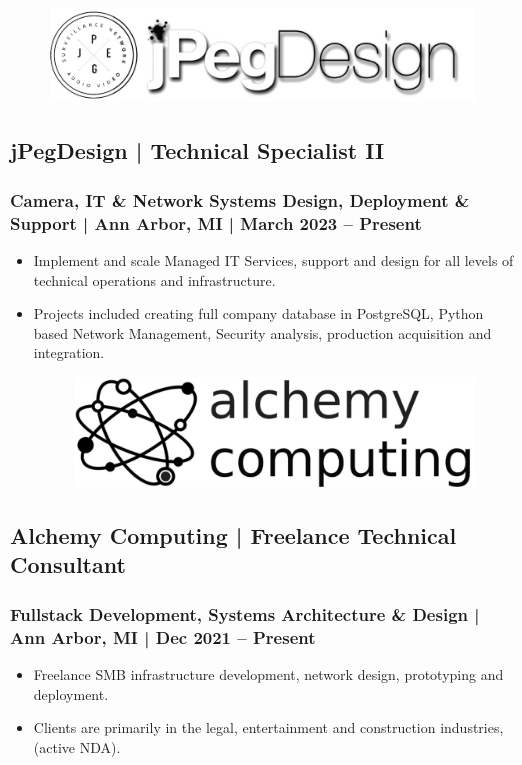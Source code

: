 \documentclass[letter,10pt]{article}
\begin{document}
\begin{figure}
\includegraphics[width=0.8\linewidth]{./img/jpeg_banner.jpg}
\end{figure}

\subsection*{jPegDesign | Technical Specialist II}
\label{sec:org7b523a7}
\subsubsection*{Camera, IT \& Network Systems Design, Deployment \& Support | Ann Arbor, MI | March 2023 – Present}
\label{sec:org040c54e}
\begin{itemize}
\item Implement and scale Managed IT Services, support and design for all levels of technical operations and infrastructure.
\label{sec:org0c16516}
\item Projects included creating full company database in PostgreSQL, Python based Network Management, Security analysis, production acquisition and integration.
\label{sec:org5d8c7ed}





\begin{figure}
\includegraphics[width=0.8\linewidth]{./img/50p_alchemy_computing.jpg}
\end{figure}
\end{itemize}

\subsection*{Alchemy Computing | Freelance Technical Consultant}
\label{sec:org3404689}
\subsubsection*{Fullstack Development, Systems Architecture \& Design | Ann Arbor, MI | Dec 2021 – Present}
\label{sec:org8cc057e}
\begin{itemize}
\item Freelance SMB infrastructure development, network design, prototyping and deployment.
\item Clients are primarily in the legal, entertainment and construction industries, (active NDA).
\end{itemize}
\end{document}
